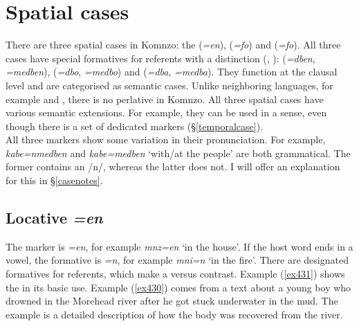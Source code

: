 \section{Spatial cases} \label{spatialcase}

There are three spatial cases in Komnzo: the  (\emph{=en}),  (\emph{=fo}) and  (\emph{=fo}). All three cases have special formatives for  referents with a  distinction (\Sg{}, \Nsg{}):  (\emph{=dben}, \emph{=medben}),  (\emph{=dbo}, \emph{=medbo}) and  (\emph{=dba}, \emph{=medba}). They function at the clausal level and are categorised as semantic cases. Unlike neighboring languages, for example  and , there is no perlative  in Komnzo. All three spatial cases have various semantic extensions. For example, they can be used in a  sense, even though there is a set of dedicated   markers (\S{}\ref{temporalcase}).\\

All three    markers show some variation in their pronunciation. For example, \emph{kabe=nmedben} and \emph{kabe=medben} `with/at the people' are both grammatical. The former contains an /n/, whereas the latter does not. I will offer an explanation for this in \S{}\ref{casenotes}.

\subsection{Locative \emph{=en}} \label{locativecase}

The   marker is \emph{=en}, for example \emph{mnz=en} `in the house'. If the host word ends in a vowel, the formative is \emph{=n}, for example \emph{mni=n} `in the fire'. There are designated formatives for  referents, which make a  versus  contrast. Example (\ref{ex431}) shows the   in its basic use. Example (\ref{ex430}) comes from a text about a young boy who drowned in the Morehead river after he got stuck underwater in the mud. The example is a detailed description of how the body was recovered from the river.

